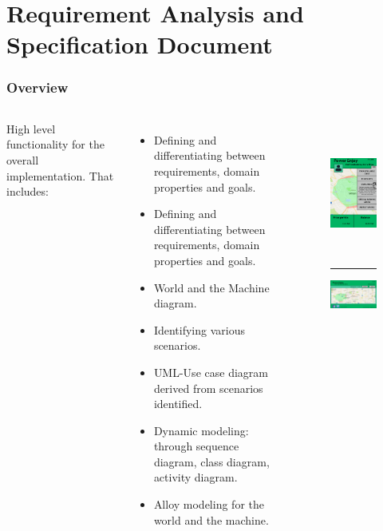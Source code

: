 \section{Requirement Analysis and Specification Document}

\begin{frame}
	\fontsize{7.5}{9}
	\frametitle{Overview}
	\begin{columns}[c]
		High level functionality for the overall implementation. That includes:
		\begin{itemize}
			\item Defining and differentiating between requirements, domain properties and goals.
			\item Defining and differentiating between requirements, domain properties and goals.
			\item World and the Machine diagram.
			\item Identifying various scenarios.
			\item UML-Use case diagram derived from scenarios identified.
			\item Dynamic modeling: through sequence diagram, class diagram, activity diagram.
			\item Alloy modeling for the world and the machine.
		\end{itemize}
		
		\begin{figure}[H]
			\centering
			\includegraphics[height=4cm,keepaspectratio]{figures/mobile_logged.eps}
			\label{fig:mobile_logged}
			\textcolor{white}{\rule{\textwidth}{0cm}}
			\centering
			\includegraphics[width=4.7cm,keepaspectratio]{figures/desktop_unlogged.eps}
			\label{fig:desktop_unlogged}
		\end{figure}
	\end{columns}
\end{frame}

